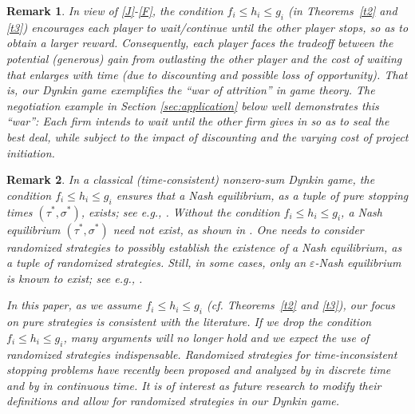 \documentclass[11pt,reqno]{article}
\numberwithin{equation}{section}
\newtheorem{remark}{Remark}[section]
\newcommand{\eps}{\varepsilon}
\begin{document}
\begin{remark}
In view of \eqref{J}-\eqref{F}, the condition $f_i \le h_i \le g_i$ (in Theorems~\ref{t2} and \ref{t3}) encourages each player to wait/continue until the other player stops, so as to obtain a larger reward. Consequently, each player faces the tradeoff between the potential (generous) gain from outlasting the other player and the cost of waiting that enlarges with time (due to discounting and possible loss of opportunity). That is, our Dynkin game exemplifies the ``war of attrition'' in game theory. The negotiation example in Section \ref{sec:application} below well demonstrates this ``war'': Each firm intends to wait until the other firm gives in so as to seal the best deal, while subject to the impact of discounting and the varying cost of project initiation.
\end{remark}

\begin{remark}\label{rem:randomized}
In a classical (time-consistent) nonzero-sum Dynkin game, the condition $f_i\le h_i\le g_i$ ensures that a Nash equilibrium, as a tuple of pure stopping times $(\tau^*,\sigma^*)$, exists; see e.g., \cite{HZ09}. Without the condition $f_i\le h_i\le g_i$, a Nash equilibrium $(\tau^*,\sigma^*)$ need not exist, as shown in \cite{LS13}. One needs to consider randomized strategies to possibly establish the existence of a Nash equilibrium, as a tuple of randomized strategies. Still, in some cases, only an $\eps$-Nash equilibrium is known to exist; see e.g., \cite{SS04, F05, LS13}. 

In this paper, as we assume $f_i\le h_i\le g_i$ (cf. Theorems~\ref{t2} and \ref{t3}), our focus on pure strategies is consistent with the literature. If we drop the condition $f_i\le h_i\le g_i$, many arguments will no longer hold and we expect the use of randomized strategies indispensable. Randomized strategies for time-inconsistent stopping problems have recently been proposed and analyzed by \cite{BZZ19} in discrete time and by \cite{CL20} in continuous time. It is of interest as future research to modify their definitions and allow for randomized strategies in our Dynkin game.
\end{remark}


\end{document}
